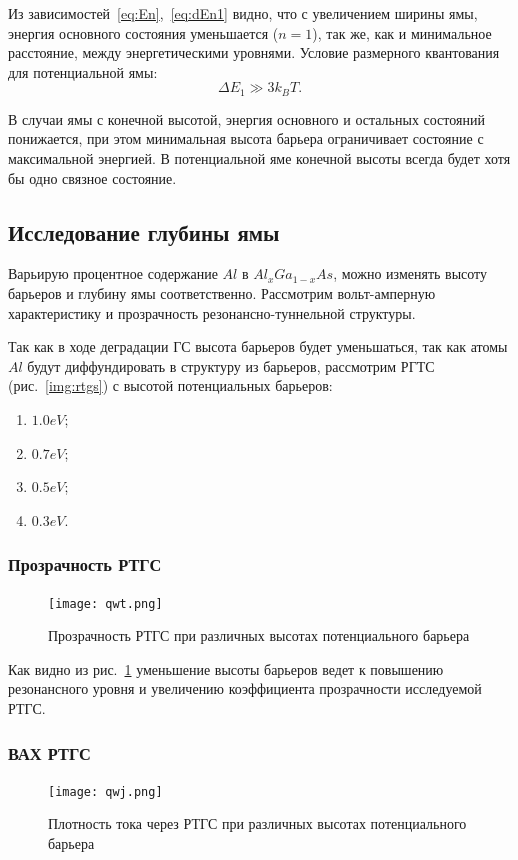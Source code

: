 Из зависимостей~\ref{eq:En},~\ref{eq:dEn1}  видно, что с увеличением ширины ямы, энергия основного состояния уменьшается ($n = 1$), так же, как и минимальное расстояние, между энергетическими уровнями. Условие размерного квантования для потенциальной ямы:
\begin{equation}
	\Delta E_{1} \gg 3k_{B}T.
\end{equation}

В случаи ямы с конечной высотой, энергия основного и остальных состояний понижается, при этом минимальная высота барьера ограничивает состояние с максимальной энергией. В потенциальной яме конечной высоты всегда будет хотя бы одно связное состояние.

\subsection{Исследование глубины ямы}
Варьирую процентное содержание $Al$ в $Al_{x}Ga_{1-x}As$, можно изменять высоту барьеров и глубину ямы соответственно. Рассмотрим вольт-амперную характеристику и прозрачность резонансно-туннельной структуры.

Так как в ходе деградации ГС высота барьеров будет уменьшаться, так как атомы $Al$ будут диффундировать в структуру из барьеров, рассмотрим РГТС (рис.~\ref{img:rtgs}) с высотой потенциальных барьеров:
\begin{enumerate}
	\item $1.0 eV$;
	\item $0.7 eV$;
	\item $0.5 eV$;
	\item $0.3 eV$.
\end{enumerate}

\subsubsection{Прозрачность РТГС}
\begin{figure}[h]
	\centering
	\texttt{[image: qwt.png]}
	\caption{Прозрачность РТГС при различных высотах потенциального барьера}
	\label{fig:qwt}
\end{figure}

Как видно из рис.~\ref{fig:qwt} уменьшение высоты барьеров ведет к повышению резонансного уровня и увеличению коэффициента прозрачности исследуемой РТГС. 

\subsubsection{ВАХ РТГС}
\begin{figure}[h]
	\centering
	\texttt{[image: qwj.png]}
	\caption{Плотность тока через РТГС при различных высотах потенциального барьера}
	\label{fig:qwj}
\end{figure}

